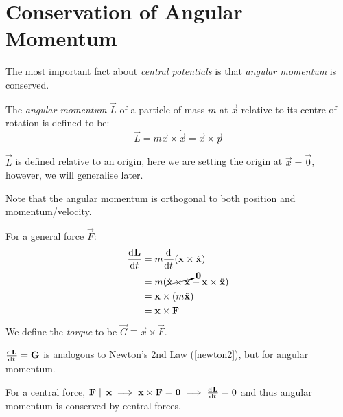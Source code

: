 \documentclass[../main.tex]{subfiles}
\begin{document}
\section{Conservation of Angular Momentum}
\label{angularMomentum}
The most important fact about \textit{central potentials} is that \textit{angular momentum} is conserved.
\begin{definition}
  The \textit{angular momentum} $\vec{L}$ of a particle of mass $m$ at $\vec{x}$ relative to its centre of rotation is defined to be:
  \[
    \vec{L} = m \vec{x} \times \dot{\vec{x}} = \vec{x} \times \vec{p}
  \]
\end{definition}
\begin{remark}
  $\vec{L}$ is defined relative to an origin, here we are setting the origin at $\vec{x} = \vec{0}$, however, we will generalise later.
\end{remark}
Note that the angular momentum is orthogonal to both position and momentum/velocity.
\begin{center}
\end{center}
For a general force $\vec{F}$:
\begin{align*}
  \deriv{\vec{L}}{t} &= m \deriv{}{t}(\vec{x} \times \dot{\vec{x}}) \\
                     &= m(\cancelto{\vec{0}}{\dot{\vec{x}} \times \dot{\vec{x}}} + \vec{x} \times \ddot{\vec{x}}) \\
                     &= \vec{x} \times (m \ddot{\vec{x}}) \\
                     &= \vec{x} \times \vec{F}
\end{align*}
We define the \textit{torque} to be $\vec{G} \equiv \vec{x} \times \vec{F}$.
\begin{remark}
  $\deriv{\vec{L}}{t} = \vec{G}$ is analogous to Newton's 2nd Law (\cref{newton2}), but for angular momentum.
\end{remark}
\label{angularConserved}
For a central force, $\vec{F} \parallel \vec{x} \implies \vec{x} \times \vec{F} = \vec{0} \implies \deriv{\vec{L}}{t} = 0$ and thus angular momentum is conserved by central forces.
\end{document}
